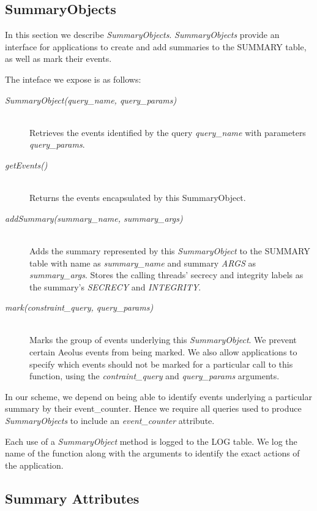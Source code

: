\subsection{SummaryObjects}

In this section we describe \emph{SummaryObjects}. \emph{SummaryObjects} provide an interface for applications to create and add summaries to the SUMMARY table, as well as mark their events.

The inteface we expose is as follows:
\begin{description}
  \item[\emph{SummaryObject(query\_name, query\_params)}] \ \\
    Retrieves the events identified by the query
    \emph{query\_name} with parameters \emph{query\_params}.
  \item[\emph{getEvents()}] \ \\
    Returns the events encapsulated by this SummaryObject.
  \item[\emph{addSummary(summary\_name, summary\_args)}] \ \\
    Adds the summary represented by this 
    \emph{SummaryObject} to the SUMMARY table with
    name as \emph{summary\_name} and summary \emph{ARGS}
    as \emph{summary\_args}.
    Stores the calling threads' secrecy and integrity
    labels as the summary's \emph{SECRECY} and
    \emph{INTEGRITY}.
  \item[\emph{mark(constraint\_query, query\_params)}] \ \\
    Marks the group of events underlying this
    \emph{SummaryObject}.
    We prevent certain Aeolus events from being marked.
    We also allow applications to specify which events
    should not be marked for a particular call
    to this function, using the \emph{contraint\_query}
    and \emph{query\_params} arguments.
\end{description}

\noindent
In our scheme, we depend on being able to identify events underlying a particular summary by their event\_counter. Hence we require all queries used to produce \emph{SummaryObjects} to include an \emph{event\_counter} attribute.

Each use of a \emph{SummaryObject} method is logged to the LOG table. We log the name of the function along with the arguments to identify the exact actions of the application.

\subsection{Summary Attributes}

